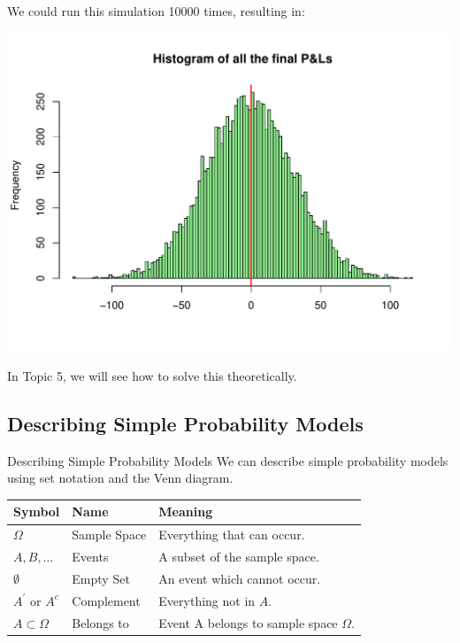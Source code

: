 \documentclass[t,xcolor=pdftex,dvipsnames,table]{beamer}\usepackage[]{graphicx}\usepackage[]{color}
\makeatletter
\def\maxwidth{ %
  \ifdim\Gin@nat@width>\linewidth
    \linewidth
  \else
    \Gin@nat@width
  \fi
}
\newenvironment{knitrout}{}{} %
\makeatother
\begin{document}
\begin{frame}{}
We could run this simulation 10000 times, resulting in:

\begin{knitrout}
\color{fgcolor}
\includegraphics[width=\maxwidth]{figure/unnamed-chunk-59-1} 

\end{knitrout}

In Topic 5, we will see how to solve this theoretically.

\end{frame}


\subsection[]{Describing Simple Probability Models}

\begin{frame}[fragile]{Describing Simple Probability Models}
We can describe simple probability models using set notation and the Venn diagram.

\vspace{.5cm}
\begin{tabular}{lll}
Symbol & Name & Meaning \\ \hline
$\Omega$ & Sample Space & Everything that can occur. \\
$A, B, \ldots$ & Events & A subset of the sample space. \\ $\emptyset$  & Empty Set & An event which cannot occur. \\
 $A^{'}$ or $A^c$ & Complement & Everything not in $A$. \\
$A \subset \Omega$  & Belongs to & Event A belongs to sample space $\Omega$. \\
\end{tabular}

\begin{center}
\end{center}

\end{frame}
\end{document}
